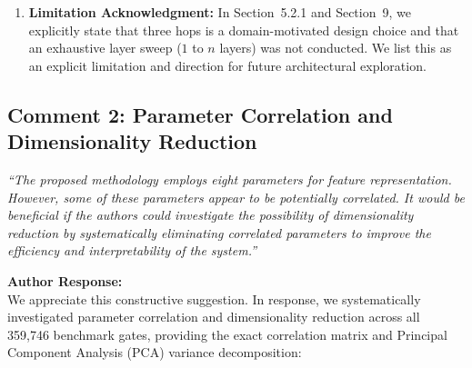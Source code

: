\documentclass[11pt,a4paper]{article}
\newcommand{\reviewercomment}[1]{\vspace{4pt}\noindent\textcolor{revcomment}{\textit{``#1''}}\vspace{4pt}}
\newcommand{\authorresponse}{\noindent\textbf{Author Response:}}
\begin{document}
\begin{enumerate}[leftmargin=*]
    \item \textbf{Limitation Acknowledgment:} In Section~5.2.1 and Section~9, we explicitly state that three hops is a domain-motivated design choice and that an exhaustive layer sweep ($1$ to $n$ layers) was not conducted. We list this as an explicit limitation and direction for future architectural exploration.
\end{enumerate}

\subsection*{Comment 2: Parameter Correlation and Dimensionality Reduction}

\reviewercomment{The proposed methodology employs eight parameters for feature representation. However, some of these parameters appear to be potentially correlated. It would be beneficial if the authors could investigate the possibility of dimensionality reduction by systematically eliminating correlated parameters to improve the efficiency and interpretability of the system.}

\authorresponse\\
We appreciate this constructive suggestion. In response, we systematically investigated parameter correlation and dimensionality reduction across all 359,746 benchmark gates, providing the exact correlation matrix and Principal Component Analysis (PCA) variance decomposition:
\end{document}
